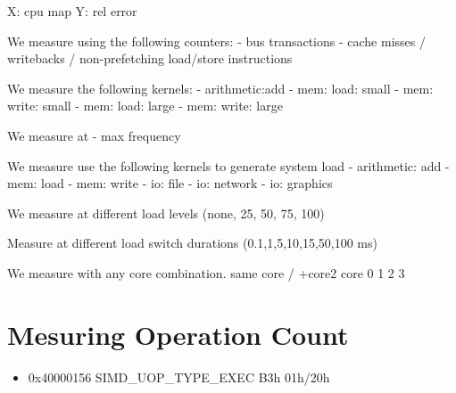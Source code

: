 \documentclass[a4paper,12pt]{article}
\begin{document}
X: cpu map Y: rel error

We measure using the following counters:
- bus transactions
- cache misses / writebacks / non-prefetching load/store instructions

We measure the following kernels:
- arithmetic:add
- mem: load: small 
- mem: write: small
- mem: load: large
- mem: write: large

We measure at 
- max frequency

We measure use the following kernels to generate system load
- arithmetic: add
- mem: load
- mem: write
- io: file 
- io: network
- io: graphics

We measure at different load levels (none, 25, 50, 75, 100)

Measure at different load switch durations (0.1,1,5,10,15,50,100 ms)

We measure with any core combination.
same core / +core2
core 0 1 2 3

\section{Mesuring Operation Count}
\begin{itemize}
\item 0x40000156   SIMD\_UOP\_TYPE\_EXEC B3h 01h/20h
\end{itemize}




\listoffigures




\end{document}

